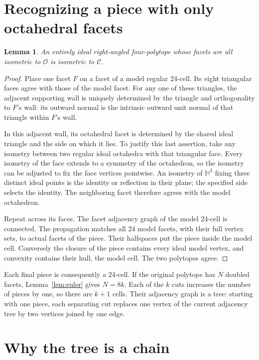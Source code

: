 \documentclass[11pt]{article}
\newtheorem{lemma}[theorem]{Lemma}
\theoremstyle{remark}
\newcommand{\HH}{\mathbb H}
\newcommand{\OCT}{\mathcal O}
\newcommand{\CELL}{\mathcal C}
\begin{document}
\section{Recognizing a piece with only octahedral facets}

\begin{lemma}\label{lem:recognition}
An entirely ideal right-angled four-polytope whose facets are all
isometric to $\OCT$ is isometric to $\CELL$.
\end{lemma}
\begin{proof}
Place one facet $F$ on a facet of a model regular 24-cell. Its
eight triangular faces agree with those of the model facet.
For any one of these triangles, the adjacent supporting wall is
uniquely determined by the triangle and orthogonality to $F$'s
wall: its outward normal is the intrinsic outward unit normal
of that triangle within $F$'s wall.

In this adjacent wall, its octahedral facet is determined by the
shared ideal triangle and the side on which it lies. To justify
this last assertion, take any isometry between two regular ideal
octahedra with that triangular face. Every isometry of the face
extends to a symmetry of the octahedron, so the isometry can be
adjusted to fix the face vertices pointwise. An isometry of
$\HH^3$ fixing three distinct ideal points is the identity or
reflection in their plane; the specified side selects the
identity. The neighboring facet therefore agrees with the model
octahedron.

Repeat across its faces. The facet adjacency graph of the model
24-cell is connected. The propagation matches all 24 model
facets, with their full vertex sets, to actual facets of the
piece. Their halfspaces put the piece inside the model cell.
Conversely the closure of the piece contains every ideal model
vertex, and convexity contains their hull, the model cell.
The two polytopes agree.
\end{proof}

Each final piece is consequently a 24-cell. If the original
polytope has $N$ doubled facets, Lemma~\ref{lem:euler} gives
$N=8k$. Each of the $k$ cuts increases the number of pieces by
one, so there are $k+1$ cells. Their adjacency graph is a tree:
starting with one piece, each separating cut replaces one vertex
of the current adjacency tree by two vertices joined by one edge.

\section{Why the tree is a chain}
\end{document}
